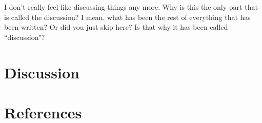 \documentclass[12pt]{article}
\begin{document}
I don't really feel like discussing things any more. Why is this the only part that is called the discussion? I mean, what has been the rest of everything that has been written? Or did you just skip here? Is that why it has been called ``discussion"?

\clearpage

\section{Discussion}\label{disc}


\clearpage

\section{References}\label{references}

\printbibliography
\end{document}
